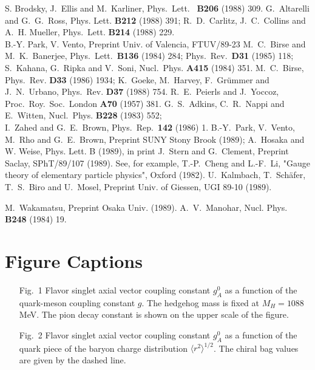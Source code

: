 \begin{thebibliography}{99}
 S. Brodsky, J.\ Ellis and M.\ Karliner,
              Phys.\ Lett. \ {\bf B206} (1988) 309.
 G.\ Altarelli and G.\ G.\ Ross,
              Phys. Lett. {\bf B212} (1988) 391; \newline
             R.\ D.\ Carlitz, J.\ C.\ Collins and A.\ H. Mueller,
             Phys.\ Lett. {\bf B214} (1988) 229. \\
             B.-Y. Park, V. Vento, Preprint Univ. of Valencia, FTUV/89-23
\bibitem{BB}  M.\ C.\ Birse and M.\ K.\ Banerjee,  Phys.\  Lett.\ 
{\bf B136} (1984) 284; Phys.\ Rev.\ {\bf D31} (1985)  118; \\ S.\ 
Kahana,  G.\ Ripka and V.\ Soni, Nucl.\  Phys.  {\bf A415} (1984) 
351.  
\bibitem{BG}  M.\ C.\ Birse, Phys.\  Rev.  {\bf D33} (1986) 
1934; \newline  K.\ Goeke, M.\ Harvey, F.\ Gr\"ummer  and J.\ N.\ 
Urbano, Phys.\ Rev.  {\bf D37} (1988) 754.  
  R.\ E.\ Peierls  and J.\ Yoccoz,  Proc.\  Roy.\  Soc.\  
London  {\bf A70} (1957) 381.  
\bibitem{ANW}  G.\ S.\ Adkins, C.\ R.\ Nappi and E.\ Witten, Nucl.\ 
Phys. {\bf B228} (1983) 552;\\ I.\ Zahed and G.\ E.\ 
Brown, Phys.\ Rep.\ {\bf 142} (1986) 1. 
\bibitem{PH} B.-Y.\ Park, V.\ Vento, M.\ Rho and G.\ E.\ Brown,  
Preprint  SUNY Stony Brook (1989); 
\newline  A.\ Hosaka and W.  Weise, Phys. Lett. B (1989), in print
\bibitem{SC}  J.\  Stern  and  G.\  Clement, 
Preprint  Saclay,  SPhT/89/107  (1989).  
\bibitem{ChL}  See,  for example,  T.-P.\ Cheng and L.-F.\ Li, "Gauge theory of elementary 
particle physics", Oxford (1982).  
\bibitem{KS} U.\ Kalmbach, T.\ 
Sch\"afer, T.\ S.\ Biro and U.\ Mosel, Preprint Univ. of Giessen, 
UGI 89-10 (1989). 

\bibitem{W}   M.\  Wakamatsu,   Preprint   Osaka  Univ.   (1989).
\bibitem{M} A.\ V.\ Manohar, Nucl. Phys. {\bf B248} (1984) 19.

\end{thebibliography}

\newpage

\section*{Figure Captions}

\begin{itemize}
\item[Fig.\ 1] Flavor singlet axial vector coupling constant $g_A^0$ as
a function of the quark-meson coupling constant $g$.  The hedgehog mass
is fixed at $M_H = 1088$ MeV.  The pion decay constant is shown on the
upper scale of the figure.
\item[Fig.\ 2] Flavor singlet axial vector coupling constant $g_A^0$ as a
function of the quark piece of the baryon charge distribution 
$\langle r^2 \rangle ^{1/2}$.  The
chiral bag values are given by the dashed line.
\end{itemize}



